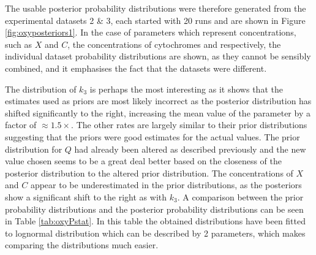 The usable posterior probability distributions were therefore generated from the experimental datasets 2 \& 3, each started with 20 runs and are shown in Figure \ref{fig:oxyposteriors1}. In the case of parameters which represent concentrations, such as $X$ and $C$, the concentrations of cytochromes and \cbbthree{} respectively, the individual dataset probability distributions are shown, as they cannot be sensibly combined, and it emphasises the fact that the datasets were different.

The distribution of $k_3$ is perhaps the most interesting as it shows that the estimates used as priors are most likely incorrect as the posterior distribution has shifted significantly to the right, increasing the mean value of the parameter by a factor of $\approx 1.5 \times$. The other rates are largely similar to their prior distributions suggesting that the priors were good estimates for the actual values. The prior distribution for $Q$ had already been altered as described previously and the new value chosen seems to be a great deal better based on the closeness of the posterior distribution to the altered prior distribution. The concentrations of $X$ and $C$ appear to be underestimated in the prior distributions, as the posteriors show a significant shift to the right as with $k_3$. A comparison between the prior probability distributions and the posterior probability distributions can be seen in Table \ref{tab:oxyPstat}. In this table the obtained distributions have been fitted to lognormal distribution which can be described by 2 parameters, which makes comparing the distributions much easier.
